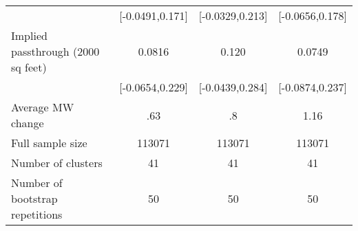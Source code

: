 {\begin{tabular}{l*{3}{c}}
            &       [-0.0491,0.171]         &       [-0.0329,0.213]         &       [-0.0656,0.178]         \\
[1em]
Implied passthrough (2000 sq feet)&                0.0816         &                 0.120         &                0.0749         \\
            &       [-0.0654,0.229]         &       [-0.0439,0.284]         &       [-0.0874,0.237]         \\
\hline
Average MW change&                   .63         &                    .8         &                  1.16         \\
Full sample size&                113071         &                113071         &                113071         \\
Number of clusters&                    41         &                    41         &                    41         \\
Number of bootstrap repetitions&                    50         &                    50         &                    50         \\
\hline\hline
\end{tabular}
}
